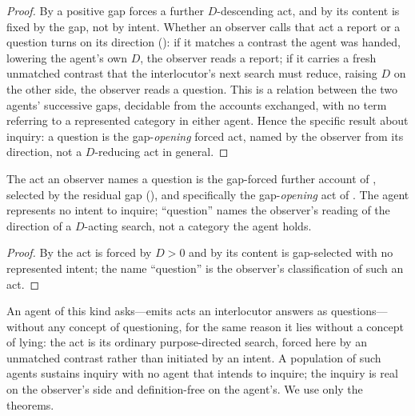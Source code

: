 \documentclass[11pt,twocolumn,a4paper]{article}
\newcommand{\dem}{D}
\begin{document}
\begin{proof}
By  a positive gap forces a further $\dem$-descending
act, and by  its content is fixed by the gap, not by
intent. Whether an observer calls that act a report or a question turns on
its direction (): if it matches a contrast the agent was
handed, lowering the agent's own $\dem$, the observer reads a report; if it
carries a fresh unmatched contrast that the interlocutor's next search must
reduce, raising $\dem$ on the other side, the observer reads a question. This
is a relation between the two agents' successive gaps, decidable from the
accounts exchanged, with no term referring to a represented category in
either agent. Hence the specific result about inquiry: a question is the
gap-\emph{opening} forced act, named by the observer from its direction, not
a $\dem$-reducing act in general.
\end{proof}

\begin{corollary}
\label{cor:question}
The act an observer names a question is the gap-forced further account of
, selected by the residual gap (),
and specifically the gap-\emph{opening} act of . The
agent represents no intent to inquire; ``question'' names the observer's
reading of the direction of a $\dem$-acting search, not a category the agent
holds.
\end{corollary}

\begin{proof}
By  the act is forced by $\dem>0$ and by
 its content is gap-selected with no represented intent;
the name ``question'' is the observer's classification of such an act.
\end{proof}

\begin{remark}
\label{rem:asking}
An agent of this kind asks---emits acts an interlocutor answers as
questions---without any concept of questioning, for the same reason it lies
without a concept of lying: the act is its ordinary purpose-directed search,
forced here by an unmatched contrast rather than initiated by an intent. A
population of such agents sustains inquiry with no agent that intends to
inquire; the inquiry is real on the observer's side and definition-free on
the agent's. We use only the theorems.
\end{remark}
\end{document}
